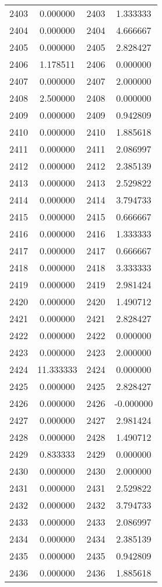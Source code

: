 \documentclass[12pt]{article}
\begin{document}
\begin{longtable}{@{}cccc@{}}
2403 & 0.000000 & 2403 & 1.333333 \\
2404 & 0.000000 & 2404 & 4.666667 \\
2405 & 0.000000 & 2405 & 2.828427 \\
2406 & 1.178511 & 2406 & 0.000000 \\
2407 & 0.000000 & 2407 & 2.000000 \\
2408 & 2.500000 & 2408 & 0.000000 \\
2409 & 0.000000 & 2409 & 0.942809 \\
2410 & 0.000000 & 2410 & 1.885618 \\
2411 & 0.000000 & 2411 & 2.086997 \\
2412 & 0.000000 & 2412 & 2.385139 \\
2413 & 0.000000 & 2413 & 2.529822 \\
2414 & 0.000000 & 2414 & 3.794733 \\
2415 & 0.000000 & 2415 & 0.666667 \\
2416 & 0.000000 & 2416 & 1.333333 \\
2417 & 0.000000 & 2417 & 0.666667 \\
2418 & 0.000000 & 2418 & 3.333333 \\
2419 & 0.000000 & 2419 & 2.981424 \\
2420 & 0.000000 & 2420 & 1.490712 \\
2421 & 0.000000 & 2421 & 2.828427 \\
2422 & 0.000000 & 2422 & 0.000000 \\
2423 & 0.000000 & 2423 & 2.000000 \\
2424 & 11.333333 & 2424 & 0.000000 \\
2425 & 0.000000 & 2425 & 2.828427 \\
2426 & 0.000000 & 2426 & -0.000000 \\
2427 & 0.000000 & 2427 & 2.981424 \\
2428 & 0.000000 & 2428 & 1.490712 \\
2429 & 0.833333 & 2429 & 0.000000 \\
2430 & 0.000000 & 2430 & 2.000000 \\
2431 & 0.000000 & 2431 & 2.529822 \\
2432 & 0.000000 & 2432 & 3.794733 \\
2433 & 0.000000 & 2433 & 2.086997 \\
2434 & 0.000000 & 2434 & 2.385139 \\
2435 & 0.000000 & 2435 & 0.942809 \\
2436 & 0.000000 & 2436 & 1.885618 \\

\end{longtable}
\end{document}
